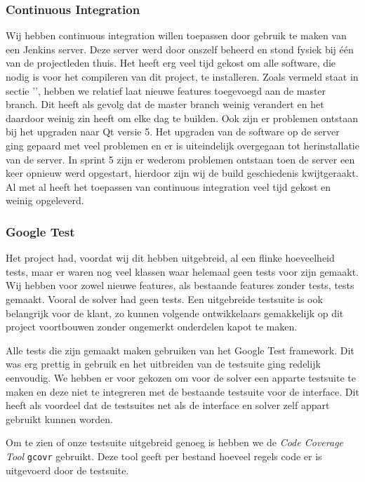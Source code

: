 \subsubsection{Continuous Integration}
Wij hebben continuous integration willen toepassen door gebruik te maken van een Jenkins server. Deze server werd door onszelf beheerd en stond fysiek bij \'e\'en van de projectleden thuis. Het heeft erg veel tijd gekost om alle software, die nodig is voor het compileren van dit project, te installeren. Zoals vermeld staat in sectie '', hebben we relatief laat nieuwe features toegevoegd aan de master branch. Dit heeft als gevolg dat de master branch weinig verandert en het daardoor weinig zin heeft om elke dag te builden. Ook zijn er problemen ontstaan bij het upgraden naar Qt versie 5. Het upgraden van de software op de server ging gepaard met veel problemen en er is uiteindelijk overgegaan tot herinstallatie van de server. In sprint 5 zijn er wederom problemen ontstaan toen de server een keer opnieuw werd opgestart, hierdoor zijn wij de build geschiedenis kwijtgeraakt. Al met al heeft het toepassen van continuous integration veel tijd gekost en weinig opgeleverd. 

\subsubsection{Google Test}
Het project had, voordat wij dit hebben uitgebreid, al een flinke hoeveelheid tests, maar er waren nog veel klassen waar helemaal geen tests voor zijn gemaakt. Wij hebben voor zowel nieuwe features, als bestaande features zonder tests, tests gemaakt. Vooral de solver had geen tests. Een uitgebreide testsuite is ook belangrijk voor de klant, zo kunnen volgende ontwikkelaars gemakkelijk op dit project voortbouwen zonder ongemerkt onderdelen kapot te maken. 

Alle tests die zijn gemaakt maken gebruiken van het Google Test framework. Dit was erg prettig in gebruik en het uitbreiden van de testsuite ging redelijk eenvoudig. We hebben er voor gekozen om voor de solver een apparte testsuite te maken en deze niet te integreren met de bestaande testsuite voor de interface. Dit heeft als voordeel dat de testsuites net als de interface en solver zelf appart gebruikt kunnen worden. 

Om te zien of onze testsuite uitgebreid genoeg is hebben we de \emph{Code Coverage Tool} \texttt{gcovr} gebruikt. Deze tool geeft per bestand hoeveel regels code er is uitgevoerd door de testsuite. 

